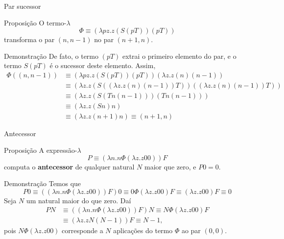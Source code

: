 \begin{frame}[fragile]{Par sucessor}

    \begin{block}{Proposição}
    O termo-$\lambda$
    \[
        \Phi \equiv (\lambda pz.z(S(pT))(pT))
    \]
    transforma o par $(n, n - 1)$ no par $(n + 1, n)$.
    \end{block}

    \begin{block}{Demonstração}
    De fato, o termo $(pT)$ extrai o primeiro elemento do par, e o termo $S(pT)$ é o sucessor
    deste elemento. Assim,
    \begin{align*}
        \Phi ((n, n - 1)) &\equiv  (\lambda pz.z(S(pT))(pT))(\lambda z.z(n)(n-1)) \\
        &\equiv  (\lambda z.z(S((\lambda z.z(n)(n-1))T))((\lambda z.z(n)(n-1))T)) \\
        &\equiv  (\lambda z.z(S(Tn(n-1)))(Tn(n-1))) \\
        &\equiv  (\lambda z.z(Sn)n) \\
        &\equiv  (\lambda z.z(n + 1)n) \equiv (n + 1, n)
    \end{align*}
    \end{block}

\end{frame}

\begin{frame}[fragile]{Antecessor}

    \begin{block}{Proposição}
    A expressão-$\lambda$
    \[
        P \equiv (\lambda n.n\Phi (\lambda z.z00))F
    \]
    computa o \textbf{antecessor} de qualquer natural $N$ maior que zero, e $P0 = 0$.
    \end{block}

    \begin{block}{Demonstração}
    Temos que
    \[
        P0 \equiv ((\lambda n.n\Phi (\lambda z.z00))F)0 \equiv 0\Phi (\lambda z.z00) F
        \equiv (\lambda z.z00)F \equiv 0
    \]
    Seja $N$ um natural maior do que zero. Daí
    \begin{align*}
        PN &\equiv ((\lambda n.n\Phi (\lambda z.z00))F)N \equiv N\Phi (\lambda z.z00) F \\
        &\equiv (\lambda z.zN(N - 1))F \equiv N - 1,
    \end{align*}
    pois $N\Phi (\lambda z.z00)$ corresponde a $N$ aplicações do termo $\Phi$ ao par $(0, 0)$.
    \end{block}
\end{frame}

